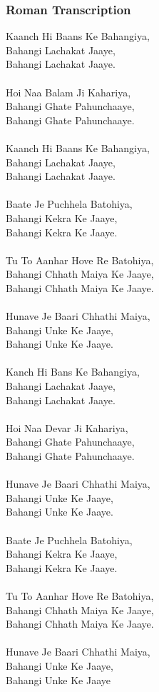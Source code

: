 \documentclass[17pt]{extarticle}
\begin{document}
\subsubsection*{\textbf{Roman Transcription}}

Kaanch Hi Baans Ke Bahangiya,\\
Bahangi Lachakat Jaaye,\\
Bahangi Lachakat Jaaye.\\\\
Hoi Naa Balam Ji Kahariya,\\
Bahangi Ghate Pahunchaaye,\\
Bahangi Ghate Pahunchaaye.\\\\
Kaanch Hi Baans Ke Bahangiya,\\
Bahangi Lachakat Jaaye,\\
Bahangi Lachakat Jaaye.\\\\
Baate Je Puchhela Batohiya,\\
Bahangi Kekra Ke Jaaye,\\
Bahangi Kekra Ke Jaaye.\\\\
Tu To Aanhar Hove Re Batohiya,\\
Bahangi Chhath Maiya Ke Jaaye,\\
Bahangi Chhath Maiya Ke Jaaye.\\\\
Hunave Je Baari Chhathi Maiya,\\
Bahangi Unke Ke Jaaye,\\
Bahangi Unke Ke Jaaye.\\\\
Kanch Hi Bans Ke Bahangiya,\\
Bahangi Lachakat Jaaye,\\
Bahangi Lachakat Jaaye.\\\\
Hoi Naa Devar Ji Kahariya,\\
Bahangi Ghate Pahunchaaye,\\
Bahangi Ghate Pahunchaaye.\\\\
Hunave Je Baari Chhathi Maiya,\\
Bahangi Unke Ke Jaaye,\\
Bahangi Unke Ke Jaaye.\\\\
Baate Je Puchhela Batohiya,\\
Bahangi Kekra Ke Jaaye,\\
Bahangi Kekra Ke Jaaye.\\\\
Tu To Aanhar Hove Re Batohiya,\\
Bahangi Chhath Maiya Ke Jaaye,\\
Bahangi Chhath Maiya Ke Jaaye.\\\\
Hunave Je Baari Chhathi Maiya,\\
Bahangi Unke Ke Jaaye,\\
Bahangi Unke Ke Jaaye\\
\end{document}
